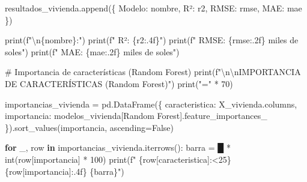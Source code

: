 \documentclass[
  doc,
  floatsintext,
  longtable,
  a4paper,
  nolmodern,
  notxfonts,
  notimes,
  12pt,
  colorlinks=true,linkcolor=blue,citecolor=blue,urlcolor=blue]{apa7}
\newenvironment{Shaded}{\begin{snugshade}}{\end{snugshade}}
\newcommand{\BuiltInTok}[1]{\textcolor[rgb]{0.00,0.23,0.31}{#1}}
\newcommand{\CharTok}[1]{\textcolor[rgb]{0.13,0.47,0.30}{#1}}
\newcommand{\CommentTok}[1]{\textcolor[rgb]{0.37,0.37,0.37}{#1}}
\newcommand{\ControlFlowTok}[1]{\textcolor[rgb]{0.00,0.23,0.31}{\textbf{#1}}}
\newcommand{\DecValTok}[1]{\textcolor[rgb]{0.68,0.00,0.00}{#1}}
\newcommand{\KeywordTok}[1]{\textcolor[rgb]{0.00,0.23,0.31}{\textbf{#1}}}
\newcommand{\NormalTok}[1]{\textcolor[rgb]{0.00,0.23,0.31}{#1}}
\newcommand{\OperatorTok}[1]{\textcolor[rgb]{0.37,0.37,0.37}{#1}}
\newcommand{\SpecialCharTok}[1]{\textcolor[rgb]{0.37,0.37,0.37}{#1}}
\newcommand{\SpecialStringTok}[1]{\textcolor[rgb]{0.13,0.47,0.30}{#1}}
\newcommand{\StringTok}[1]{\textcolor[rgb]{0.13,0.47,0.30}{#1}}
\newcommand{\VariableTok}[1]{\textcolor[rgb]{0.07,0.07,0.07}{#1}}
\begin{document}
\begin{Shaded}
\begin{Highlighting}[]
\NormalTok{    resultados\_vivienda.append(\{}
        \StringTok{\textquotesingle{}Modelo\textquotesingle{}}\NormalTok{: nombre,}
        \StringTok{\textquotesingle{}R²\textquotesingle{}}\NormalTok{: r2,}
        \StringTok{\textquotesingle{}RMSE\textquotesingle{}}\NormalTok{: rmse,}
        \StringTok{\textquotesingle{}MAE\textquotesingle{}}\NormalTok{: mae}
\NormalTok{    \})}
    
    \BuiltInTok{print}\NormalTok{(}\SpecialStringTok{f"}\CharTok{\textbackslash{}n}\SpecialCharTok{\{}\NormalTok{nombre}\SpecialCharTok{\}}\SpecialStringTok{:"}\NormalTok{)}
    \BuiltInTok{print}\NormalTok{(}\SpecialStringTok{f"  R²:   }\SpecialCharTok{\{}\NormalTok{r2}\SpecialCharTok{:.4f\}}\SpecialStringTok{"}\NormalTok{)}
    \BuiltInTok{print}\NormalTok{(}\SpecialStringTok{f"  RMSE: }\SpecialCharTok{\{}\NormalTok{rmse}\SpecialCharTok{:.2f\}}\SpecialStringTok{ miles de soles"}\NormalTok{)}
    \BuiltInTok{print}\NormalTok{(}\SpecialStringTok{f"  MAE:  }\SpecialCharTok{\{}\NormalTok{mae}\SpecialCharTok{:.2f\}}\SpecialStringTok{ miles de soles"}\NormalTok{)}

\CommentTok{\# Importancia de características (Random Forest)}
\BuiltInTok{print}\NormalTok{(}\SpecialStringTok{f"}\CharTok{\textbackslash{}n\textbackslash{}n}\SpecialStringTok{IMPORTANCIA DE CARACTERÍSTICAS (Random Forest)"}\NormalTok{)}
\BuiltInTok{print}\NormalTok{(}\StringTok{"="} \OperatorTok{*} \DecValTok{70}\NormalTok{)}

\NormalTok{importancias\_vivienda }\OperatorTok{=}\NormalTok{ pd.DataFrame(\{}
    \StringTok{\textquotesingle{}caracteristica\textquotesingle{}}\NormalTok{: X\_vivienda.columns,}
    \StringTok{\textquotesingle{}importancia\textquotesingle{}}\NormalTok{: modelos\_vivienda[}\StringTok{\textquotesingle{}Random Forest\textquotesingle{}}\NormalTok{].feature\_importances\_}
\NormalTok{\}).sort\_values(}\StringTok{\textquotesingle{}importancia\textquotesingle{}}\NormalTok{, ascending}\OperatorTok{=}\VariableTok{False}\NormalTok{)}

\ControlFlowTok{for}\NormalTok{ \_, row }\KeywordTok{in}\NormalTok{ importancias\_vivienda.iterrows():}
\NormalTok{    barra }\OperatorTok{=} \StringTok{\textquotesingle{}█\textquotesingle{}} \OperatorTok{*} \BuiltInTok{int}\NormalTok{(row[}\StringTok{\textquotesingle{}importancia\textquotesingle{}}\NormalTok{] }\OperatorTok{*} \DecValTok{100}\NormalTok{)}
    \BuiltInTok{print}\NormalTok{(}\SpecialStringTok{f"  }\SpecialCharTok{\{}\NormalTok{row[}\StringTok{\textquotesingle{}caracteristica\textquotesingle{}}\NormalTok{]}\SpecialCharTok{:\textless{}25\}}\SpecialStringTok{ }\SpecialCharTok{\{}\NormalTok{row[}\StringTok{\textquotesingle{}importancia\textquotesingle{}}\NormalTok{]}\SpecialCharTok{:.4f\}}\SpecialStringTok{ }\SpecialCharTok{\{}\NormalTok{barra}\SpecialCharTok{\}}\SpecialStringTok{"}\NormalTok{)}


\end{Highlighting}
\end{Shaded}
\end{document}
